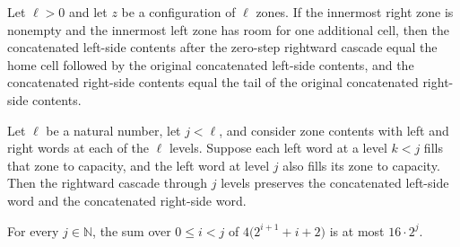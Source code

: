\begin{theorem}
\label{Turing.zoneCascadeRight_zero}
\leanok
{}
Let $\ell>0$ and let $z$ be a configuration of $\ell$ zones. If the innermost right zone
is nonempty and the innermost left zone has room for one additional cell, then the
concatenated left-side contents after the zero-step rightward cascade equal the home
cell followed by the original concatenated left-side contents, and the concatenated
right-side contents equal the tail of the original concatenated right-side contents.
\end{theorem}

\begin{theorem}
\label{Turing.zoneCascadeRight_blocked}
\leanok
{}
Let $\ell$ be a natural number, let $j<\ell$, and consider zone contents with left and
right words at each of the $\ell$ levels. Suppose each left word at a level $k<j$ fills
that zone to capacity, and the left word at level $j$ also fills its zone to capacity.
Then the rightward cascade through $j$ levels preserves the concatenated left-side word
and the concatenated right-side word.
\end{theorem}

\begin{theorem}
\label{Turing.zoneCascade_cost_le}
\leanok
{}
For every $j\in\mathbb{N}$, the sum over $0\le i<j$ of $4\bigl(2^{i+1}+i+2\bigr)$ is at
most $16\cdot 2^j$.
\end{theorem}

